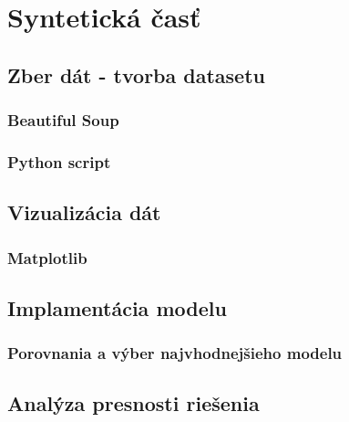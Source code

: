 
\chapter{Syntetická časť}


\section{Zber dát - tvorba datasetu}
\subsection{Beautiful Soup}
\subsection{Python script}

\section{Vizualizácia dát}
\subsection{Matplotlib}

\section{Implamentácia modelu}
\subsection{Porovnania a výber najvhodnejšieho modelu}

\section{Analýza presnosti riešenia}
\subsection{}



